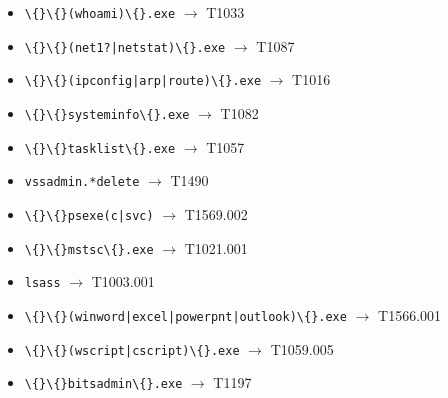 \begin{itemize}
\item \texttt{\textbackslash\{\}\textbackslash\{\}(\allowbreak{}whoami)\allowbreak{}\textbackslash\{\}.\allowbreak{}exe} $\rightarrow$ T1033
\item \texttt{\textbackslash\{\}\textbackslash\{\}(\allowbreak{}net1?\allowbreak{}|\allowbreak{}netstat)\allowbreak{}\textbackslash\{\}.\allowbreak{}exe} $\rightarrow$ T1087
\item \texttt{\textbackslash\{\}\textbackslash\{\}(\allowbreak{}ipconfig|\allowbreak{}arp|\allowbreak{}route)\allowbreak{}\textbackslash\{\}.\allowbreak{}exe} $\rightarrow$ T1016
\item \texttt{\textbackslash\{\}\textbackslash\{\}systeminfo\textbackslash\{\}.\allowbreak{}exe} $\rightarrow$ T1082
\item \texttt{\textbackslash\{\}\textbackslash\{\}tasklist\textbackslash\{\}.\allowbreak{}exe} $\rightarrow$ T1057
\item \texttt{vssadmin.\allowbreak{}*\allowbreak{}delete} $\rightarrow$ T1490
\item \texttt{\textbackslash\{\}\textbackslash\{\}psexe(\allowbreak{}c|\allowbreak{}svc)\allowbreak{}} $\rightarrow$ T1569.\allowbreak{}002
\item \texttt{\textbackslash\{\}\textbackslash\{\}mstsc\textbackslash\{\}.\allowbreak{}exe} $\rightarrow$ T1021.\allowbreak{}001
\item \texttt{lsass} $\rightarrow$ T1003.\allowbreak{}001
\item \texttt{\textbackslash\{\}\textbackslash\{\}(\allowbreak{}winword|\allowbreak{}excel|\allowbreak{}powerpnt|\allowbreak{}outlook)\allowbreak{}\textbackslash\{\}.\allowbreak{}exe} $\rightarrow$ T1566.\allowbreak{}001
\item \texttt{\textbackslash\{\}\textbackslash\{\}(\allowbreak{}wscript|\allowbreak{}cscript)\allowbreak{}\textbackslash\{\}.\allowbreak{}exe} $\rightarrow$ T1059.\allowbreak{}005
\item \texttt{\textbackslash\{\}\textbackslash\{\}bitsadmin\textbackslash\{\}.\allowbreak{}exe} $\rightarrow$ T1197
\end{itemize}

